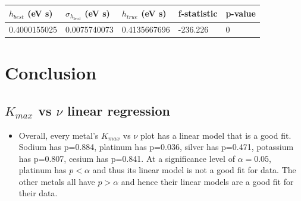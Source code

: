 \documentclass{article}
\begin{document}
\begin{table}[ht]
\begin{tabular}{|l|l|l|l|l|}
\hline
$h_{best}$ (eV s) & $\sigma_{h_{best}}$ (eV s) & $h_{true}$ (eV s) & f-statistic & p-value \\ \hline
0.4000155025      & 0.0075740073               & 0.4135667696      & -236.226    & 0       \\ \hline
\end{tabular}
\end{table}


\section{Conclusion}

\subsection{$K_{max}$ vs $\nu$ linear regression}
\begin{itemize}
\item Overall, every metal's $K_{max}$ vs $\nu$ plot has a linear model that is a good fit. Sodium has p=0.884, platinum has p=0.036, silver has p=0.471, potassium has p=0.807, cesium has p=0.841. At a significance level of $\alpha = 0.05$, platinum has $p<\alpha$ and thus its linear model is not a good fit for data. The other metals all have $p > \alpha$ and hence their linear models are a good fit for their data.
\end{itemize}
\end{document}
